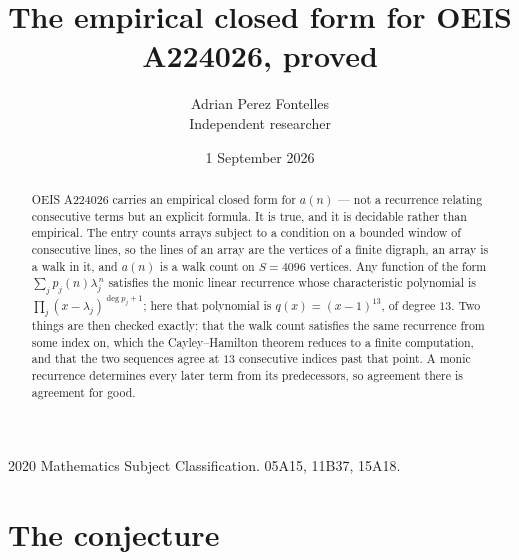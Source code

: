 \documentclass[11pt,a4paper]{article}
\title{The empirical closed form for OEIS A224026, proved}
\author{Adrian Perez Fontelles\\ \small Independent researcher}
\date{1 September 2026}
\theoremstyle{plain}
\theoremstyle{definition}
\begin{document}
\maketitle

\begin{abstract}
OEIS A224026 carries an empirical closed form for $a(n)$ --- not a recurrence relating
consecutive terms but an explicit formula. It is true, and it is decidable rather than
empirical. The entry counts arrays subject to a condition on a bounded window of consecutive lines, so the lines of an array are the
vertices of a finite digraph, an array is a walk in it, and $a(n)$ is a walk count on
$S=4096$ vertices. Any function of the form $\sum_j p_j(n)\lambda_j^{\,n}$ satisfies the
monic linear recurrence whose characteristic polynomial is
$\prod_j(x-\lambda_j)^{\deg p_j+1}$; here that polynomial is $q(x)=(x-1)^{13}$, of degree
$13$. Two things are then checked exactly: that the walk count satisfies the same
recurrence from some index on, which the Cayley--Hamilton theorem reduces to a finite
computation, and that the two sequences agree at $13$ consecutive indices past that
point. A monic recurrence determines every later term from its predecessors, so agreement
there is agreement for good.
\end{abstract}

\noindent\small 2020 Mathematics Subject Classification. 05A15, 11B37, 15A18.\normalsize

\section{The conjecture}
\end{document}
